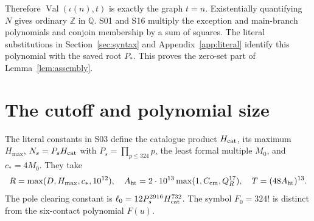 \documentclass[11pt]{article}
\theoremstyle{definition}
\theoremstyle{remark}
\newcommand{\Q}{\mathbb Q}
\newcommand{\Z}{\mathbb Z}
\newcommand{\Val}{\operatorname{Val}}
\begin{document}
Therefore $\Val(\iota(n),t)$ is exactly the graph $t=n$.
Existentially quantifying $N$ gives ordinary $\Z$ in $\Q$.
S01 and S16 multiply the exception and main-branch polynomials and
conjoin membership by a sum of squares. The literal substitutions in
Section~\ref{sec:syntax} and Appendix~\ref{app:literal} identify this
polynomial with the saved root $P_*$. This proves the zero-set part of
Lemma~\ref{lem:assembly}.



\section{The cutoff and polynomial size}\label{sec:size}
The literal constants in S03 define the catalogue product $H_{\rm cat}$,
its maximum $H_{\max}$, $N_s=P_sH_{\rm cat}$ with
$P_s=\prod_{p\le324}p$, the least formal multiple $M_0$, and $c_*=4M_0$.
They take
\[
 R=\max(D,H_{\max},c_*,10^{12}),\quad
 A_{\rm ht}=2\cdot10^{13}\max(1,C_{\rm cm},Q_R^{17}),\quad
 T=(48A_{\rm ht})^{13}.
\]
The pole clearing constant is $\ell_0=12P_s^{2916}H_{\rm cat}^{732}$.
The symbol $F_0=324!$ is distinct from the six-contact polynomial $F(u)$.
\end{document}

